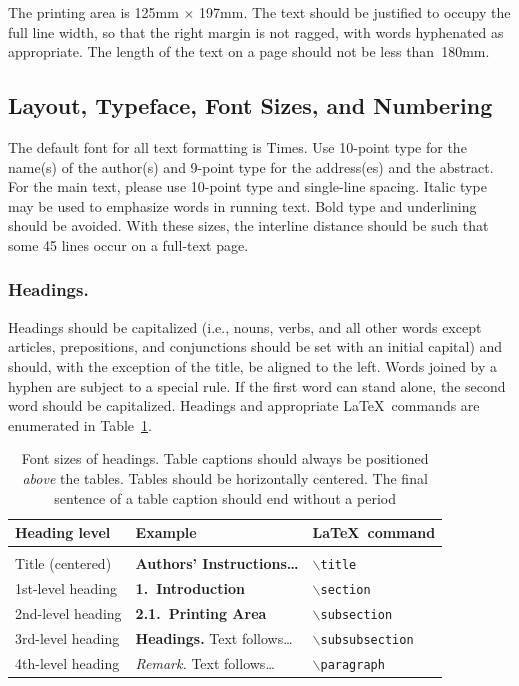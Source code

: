 \documentclass[runningheads]{AIIT}
\begin{document}
The printing area is 125mm $\times$ 197mm. The text should be justified to
occupy the full line width, so that the right margin is not ragged, with words
hyphenated as appropriate. The length of the text on a page should not be less
than~180mm.

\subsection{Layout, Typeface, Font Sizes, and Numbering}

The default font for all text formatting is Times. Use 10-point type for the
name(s) of the author(s) and 9-point type for the address(es) and the abstract.
For the main text, please use 10-point type and single-line spacing. Italic type
may be used to emphasize words in running text. Bold type and underlining should
be avoided. With these sizes, the interline distance should be such that some 45
lines occur on a full-text page.

\subsubsection{Headings.} Headings should be capitalized (i.e., nouns, verbs, and
all other words except articles, prepositions, and conjunctions should be set
with an initial capital) and should, with the exception of the title, be
aligned to the left. Words joined by a hyphen are subject to a special rule.
If the first word can stand alone, the second word should be capitalized.
Headings and appropriate \LaTeX\ commands are enumerated in
Table~\ref{tbl:headings}.

\begin{table}
\caption{Font sizes of headings. Table captions should always be positioned
\emph{above} the tables. Tables should be horizontally centered. The final
sentence of a table caption should end without a period}\label{tbl:headings}
\centering
\setlength\tabcolsep{0.5em}
\begin{tabular}{lll}
\hline
Heading level      & Example                                    & \LaTeX\ command \\ \hline \\[-2ex]
Title (centered)   & \textbf{\Large Authors' Instructions\dots} & \texttt{$\backslash$title} \\
1st-level heading  & \textbf{\large 1.\ Introduction}           & \texttt{$\backslash$section} \\
2nd-level heading  & \textbf{2.1.\ Printing Area}               & \texttt{$\backslash$subsection} \\
3rd-level heading  & \textbf{Headings.} Text follows\dots       & \texttt{$\backslash$subsubsection} \\
4th-level heading  & \textit{Remark.} Text follows\dots         & \texttt{$\backslash$paragraph} \\ \hline
\end{tabular}
\end{table}
\end{document}

